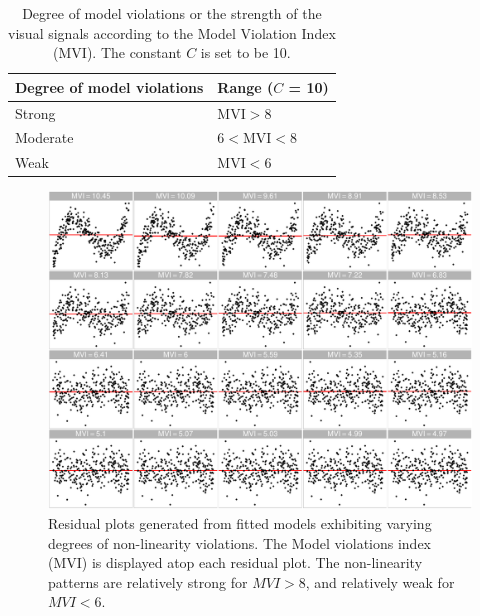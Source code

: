 \documentclass[]{interact}
\theoremstyle{plain}%
\theoremstyle{definition}
\theoremstyle{remark}
\begin{document}
\begin{table}

\caption{\label{tab:mvi}Degree of model violations or the strength of the visual signals according to the Model Violation Index (MVI). The constant $C$ is set to be 10.}
\centering
\begin{tabular}[t]{ll}
\toprule
Degree of model violations & Range ($C$ = 10)\\
\midrule
Strong & $\text{MVI} > 8$\\
Moderate & $6 < \text{MVI} < 8$\\
Weak & $\text{MVI} < 6$\\
\bottomrule
\end{tabular}
\end{table}

\begin{figure}[!h]

{\centering \includegraphics[width=1\linewidth]{paper_files/figure-latex/poly-index-1} 

}

\caption{Residual plots generated from fitted models exhibiting varying degrees of non-linearity violations. The Model violations index (MVI) is displayed atop each residual plot. The non-linearity patterns are relatively strong for $MVI > 8$, and relatively weak for $MVI < 6$.}\label{fig:poly-index}
\end{figure}
\end{document}
